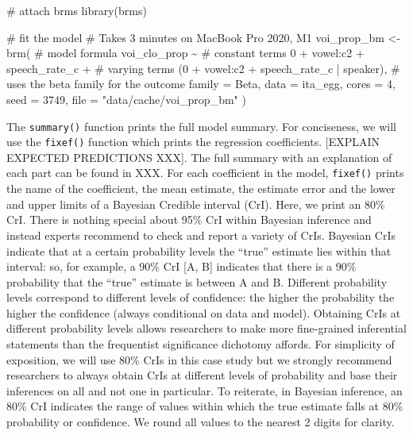 \documentclass[
  authoryear,
  preprint,
  3p]{elsarticle}
\newenvironment{Shaded}{\begin{snugshade}}{\end{snugshade}}
\newcommand{\AttributeTok}[1]{\textcolor[rgb]{0.40,0.45,0.13}{#1}}
\newcommand{\CommentTok}[1]{\textcolor[rgb]{0.37,0.37,0.37}{#1}}
\newcommand{\DecValTok}[1]{\textcolor[rgb]{0.68,0.00,0.00}{#1}}
\newcommand{\FunctionTok}[1]{\textcolor[rgb]{0.28,0.35,0.67}{#1}}
\newcommand{\NormalTok}[1]{\textcolor[rgb]{0.00,0.23,0.31}{#1}}
\newcommand{\OtherTok}[1]{\textcolor[rgb]{0.00,0.23,0.31}{#1}}
\newcommand{\SpecialCharTok}[1]{\textcolor[rgb]{0.37,0.37,0.37}{#1}}
\newcommand{\StringTok}[1]{\textcolor[rgb]{0.13,0.47,0.30}{#1}}
\begin{document}
\begin{Shaded}
\begin{Highlighting}[]
\CommentTok{\# attach brms}
\FunctionTok{library}\NormalTok{(brms)}

\CommentTok{\# fit the model}
\CommentTok{\# Takes 3 minutes on MacBook Pro 2020, M1}
\NormalTok{voi\_prop\_bm }\OtherTok{\textless{}{-}} \FunctionTok{brm}\NormalTok{(}
  \CommentTok{\# model formula}
\NormalTok{  voi\_clo\_prop }\SpecialCharTok{\textasciitilde{}}
    \CommentTok{\# constant terms}
    \DecValTok{0} \SpecialCharTok{+}\NormalTok{ vowel}\SpecialCharTok{:}\NormalTok{c2 }\SpecialCharTok{+}\NormalTok{ speech\_rate\_c }\SpecialCharTok{+}
    \CommentTok{\# varying terms}
\NormalTok{    (}\DecValTok{0} \SpecialCharTok{+}\NormalTok{ vowel}\SpecialCharTok{:}\NormalTok{c2 }\SpecialCharTok{+}\NormalTok{ speech\_rate\_c }\SpecialCharTok{|}\NormalTok{ speaker),}
  \CommentTok{\# uses the beta family for the outcome}
  \AttributeTok{family =}\NormalTok{ Beta,}
  \AttributeTok{data =}\NormalTok{ ita\_egg,}
  \AttributeTok{cores =} \DecValTok{4}\NormalTok{,}
  \AttributeTok{seed =} \DecValTok{3749}\NormalTok{,}
  \AttributeTok{file =} \StringTok{"data/cache/voi\_prop\_bm"}
\NormalTok{)}
\end{Highlighting}
\end{Shaded}

The \texttt{summary()} function prints the full model summary. For
conciseness, we will use the \texttt{fixef()} function which prints the
regression coefficients. {[}EXPLAIN EXPECTED PREDICTIONS XXX{]}. The
full summary with an explanation of each part can be found in XXX. For
each coefficient in the model, \texttt{fixef()} prints the name of the
coefficient, the mean estimate, the estimate error and the lower and
upper limits of a Bayesian Credible interval (CrI). Here, we print an
80\% CrI. There is nothing special about 95\% CrI within Bayesian
inference and instead experts recommend to check and report a variety of
CrIs. Bayesian CrIs indicate that at a certain probability levels the
``true'' estimate lies within that interval: so, for example, a 90\% CrI
{[}A, B{]} indicates that there is a 90\% probability that the ``true''
estimate is between A and B. Different probability levels correspond to
different levels of confidence: the higher the probability the higher
the confidence (always conditional on data and model). Obtaining CrIs at
different probability levels allows researchers to make more
fine-grained inferential statements than the frequentist significance
dichotomy affords. For simplicity of exposition, we will use 80\% CrIs
in this case study but we strongly recommend researchers to always
obtain CrIs at different levels of probability and base their inferences
on all and not one in particular. To reiterate, in Bayesian inference,
an 80\% CrI indicates the range of values within which the true estimate
falls at 80\% probability or confidence. We round all values to the
nearest 2 digits for clarity.
\end{document}
